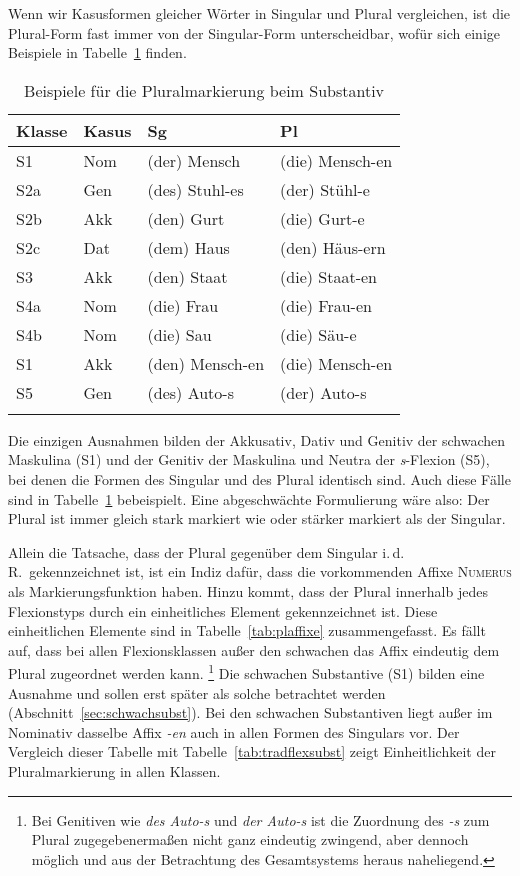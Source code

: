 \label{sec:pluralmark}


Wenn wir Kasusformen gleicher Wörter in Singular und Plural vergleichen, ist die Plural-Form fast immer von der Singular-Form unterscheidbar, wofür sich einige Beispiele in Tabelle~\ref{tab:sgplvergl} finden.

\begin{table}[!h]
  \centering
  \begin{tabular}{llll}
    \lsptoprule
    \textbf{Klasse} & \textbf{Kasus} & \textbf{Sg} & \textbf{Pl} \\
    \midrule
    S1 & Nom & (der) Mensch & (die) Mensch-en \\
    S2a & Gen & (des) Stuhl-es & (der) Stühl-e \\
    S2b & Akk & (den) Gurt & (die) Gurt-e \\
    S2c & Dat & (dem) Haus & (den) Häus-ern \\
    S3 & Akk & (den) Staat & (die) Staat-en \\
    S4a & Nom & (die) Frau & (die) Frau-en \\
    S4b & Nom & (die) Sau & (die) Säu-e \\
    \midrule
    S1 & Akk & (den) Mensch-en & (die) Mensch-en \\
    S5 & Gen & (des) Auto-s & (der) Auto-s \\
    \lspbottomrule
  \end{tabular}
  \caption{Beispiele für die Pluralmarkierung beim Substantiv}
  \label{tab:sgplvergl}
\end{table}

Die einzigen Ausnahmen bilden der Akkusativ, Dativ und Genitiv der schwachen Maskulina (S1) und der Genitiv der Maskulina und Neutra der \textit{s}-Flexion (S5), bei denen die Formen des Singular und des Plural identisch sind.
Auch diese Fälle sind in Tabelle~\ref{tab:sgplvergl} bebeispielt.
Eine abgeschwächte Formulierung wäre also:
Der Plural ist immer gleich stark markiert wie oder stärker markiert als der Singular.

Allein die Tatsache, dass der Plural gegenüber dem Singular i.\,d.\,R.\ gekennzeichnet ist, ist ein Indiz dafür, dass die vorkommenden Affixe \textsc{Numerus} als Markierungsfunktion haben.
Hinzu kommt, dass der Plural innerhalb jedes Flexionstyps durch ein einheitliches Element gekennzeichnet ist.
Diese einheitlichen Elemente sind in Tabelle~\ref{tab:plaffixe} zusammengefasst.
Es fällt auf, dass bei allen Flexionsklassen außer den schwachen das Affix eindeutig dem Plural zugeordnet werden kann.%
\footnote{Bei Genitiven wie \textit{des Auto-s} und \textit{der Auto-s} ist die Zuordnung des \textit{-s} zum Plural zugegebenermaßen nicht ganz eindeutig zwingend, aber dennoch möglich und aus der Betrachtung des Gesamtsystems heraus naheliegend.}
Die schwachen Substantive (S1) bilden eine Ausnahme und sollen erst später als solche betrachtet werden (Abschnitt~\ref{sec:schwachsubst}).
Bei den schwachen Substantiven liegt außer im Nominativ dasselbe Affix \textit{-en} auch in allen Formen des Singulars vor.
Der Vergleich dieser Tabelle mit Tabelle~\ref{tab:tradflexsubst} zeigt Einheitlichkeit der Pluralmarkierung in allen Klassen.

